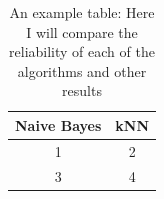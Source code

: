 \documentclass[10pt,twocolumn,letterpaper]{article}
\begin{document}
\begin{table}[]
    \centering
    \begin{tabular}{c|c}
        Naive Bayes & kNN \\
        \hline
        1 & 2 \\
        3 & 4
    \end{tabular}
    \caption{An example table: Here I will compare the reliability of each of the algorithms and other results}
    \label{tab:my_label}
\end{table}

\newpage
{\small


}

\nocite{*}
\end{document}
